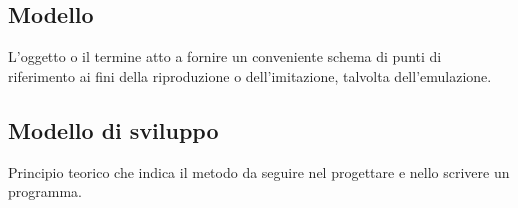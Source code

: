 \documentclass[../glossario.tex]{subfiles}
\begin{document}
\subsection*{Modello} 
L'oggetto o il termine atto a fornire un conveniente schema di punti di riferimento ai fini della riproduzione o dell'imitazione, talvolta dell'emulazione.

\subsection*{Modello di sviluppo} 
Principio teorico che indica il metodo da seguire nel progettare e nello scrivere un programma.

    
\end{document}
